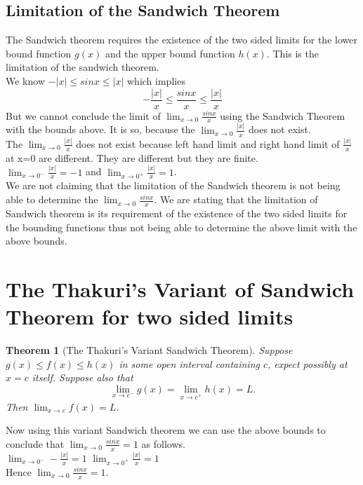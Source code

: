 \documentclass[a4paper,twoside,12pt]{article}
\theoremstyle{plain}
\newtheorem{theorem}{Theorem}[section]
\theoremstyle{definition}
\theoremstyle{theorem}
\begin{document}
{\subsection{Limitation of the Sandwich Theorem}
The Sandwich theorem requires the existence of the two sided limits for the lower bound function $g(x)$ and the upper bound function $h(x)$. This is the limitation of the sandwich theorem. \\
We know \(\displaystyle - \left | x \right | \leq sinx \leq \left | x \right | \) which implies \[-\frac{\left | x \right |}{x} \leq \frac{sinx}{x} \leq \frac{\left | x \right |}{x}\]
But we cannot conclude the limit of \(\displaystyle \lim_{x \to 0} \frac{sinx}{x}\) using the Sandwich Theorem with the bounds above. It is so, because the \(\displaystyle \lim_{x \to 0} \frac{|x|}{x}\) does not exist. \\[2mm]
The \(\displaystyle \lim_{x \to 0} \frac{|x|}{x}\) does not exist because left hand limit and right hand limit of \(\displaystyle \frac{|x|}{x}\) at x=0 are different. They are different but they are finite.\\
\(\displaystyle \lim_{x \to 0^-} \frac{|x|}{x}=-1\) \hspace{5mm} and \hspace{5cm} \(\displaystyle \lim_{x \to 0^+} \frac{|x|}{x}=1\). \\[3mm]
We are not claiming that the limitation of the Sandwich theorem is not being able to determine the \(\displaystyle \lim_{x \to 0} \frac{sinx}{x}\). We are stating that the limitation of Sandwich theorem is its requirement of  the existence of the two sided limits for the bounding functions thus not being able to determine the above limit with the above bounds.
\vspace{5mm}
\section{The Thakuri's Variant of Sandwich Theorem for two sided limits}
\begin{theorem}[The Thakuri's Variant Sandwich Theorem]
Suppose $g(x) \leq f(x) \leq h(x)$ in some open interval containing $c$, expect possibly at $x=c$ itself. Suppose also that $$\lim_{x \to c^-} g(x) = \lim_{x \to c^+} h(x) =L  .$$ Then $\displaystyle \lim_{x \to c} f(x)=L$.
\end{theorem}
Now using this variant Sandwich theorem we can use the above bounds to conclude that \(\displaystyle \lim_{x \to 0} \frac{sinx}{x}=1\) as follows. \\[2mm]
 \(\displaystyle \lim_{x \to 0^-} -\frac{|x|}{x}=1\) \hspace{7cm}
 \(\displaystyle \lim_{x \to 0^+} \frac{|x|}{x}=1\) \\[1mm]
 Hence \(\displaystyle \lim_{x \to 0} \frac{sinx}{x}=1\).

}
\end{document}
